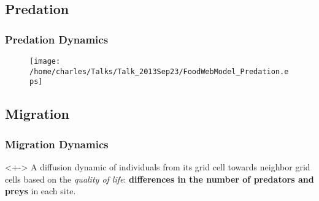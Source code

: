 \documentclass[xcolor=x11names,compress]{beamer}
\renewcommand{\(}{\begin{columns}}
\renewcommand{\)}{\end{columns}}
\newcommand{\<}[1]{\begin{column}{#1}}
\renewcommand{\>}{\end{column}}
\begin{document}

\subsection{Predation}

\begin{frame}
\frametitle{Predation Dynamics}
\begin{figure}
\texttt{[image: /home/charles/Talks/Talk\_2013Sep23/FoodWebModel\_Predation.eps]}
\end{figure}
\end{frame}


\subsection{Migration}

\begin{frame}
\frametitle{Migration Dynamics}
\begin{block}<+->{}
A diffusion dynamic of individuals from its grid cell towards neighbor grid cells based on the \emph{quality of life}: \textbf{differences in the number of predators and preys} in each site. 
\end{block} 
\end{frame}
\end{document}
